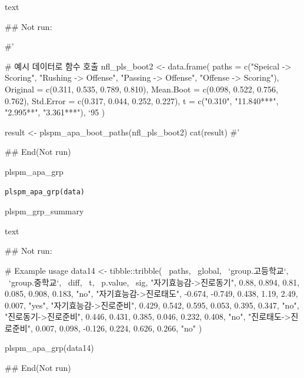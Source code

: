 \documentclass[a4paper]{book}
\begin{document}
%
\begin{Value}
text
\end{Value}
%
\begin{Examples}
\begin{ExampleCode}

\#\# Not run: 

#'

# 예시 데이터로 함수 호출
nfl_pls_boot2 <- data.frame(
  paths = c("Speical -> Scoring", "Rushing -> Offense", "Passing -> Offense", "Offense -> Scoring"),
  Original = c(0.311, 0.535, 0.789, 0.810),
  Mean.Boot = c(0.098, 0.522, 0.756, 0.762),
  Std.Error = c(0.317, 0.044, 0.252, 0.227),
  t = c("0.310", "11.840***", "2.995**", "3.361***"),
  `95%
)

result <- plspm_apa_boot_paths(nfl_pls_boot2)
cat(result)
#'

## End(Not run)

\end{ExampleCode}
\end{Examples}
%
\begin{Description}
plspm\_apa\_grp
\end{Description}
%
\begin{Usage}
\begin{verbatim}
plspm_apa_grp(data)
\end{verbatim}
\end{Usage}
%
\begin{Arguments}
\begin{ldescription}
\item[\code{data}] plspm\_grp\_summary
\end{ldescription}
\end{Arguments}
%
\begin{Value}
text
\end{Value}
%
\begin{Examples}
\begin{ExampleCode}

\#\# Not run: 

# Example usage
data14 <- tibble::tribble(
  ~paths, ~global, ~`group.고등학교`, ~`group.중학교`, ~diff, ~t, ~p.value, ~sig,
  "자기효능감->진로동기", 0.88, 0.894, 0.81, 0.085, 0.908, 0.183, "no",
  "자기효능감->진로태도", -0.674, -0.749, 0.438, 1.19, 2.49, 0.007, "yes",
  "자기효능감->진로준비", 0.429, 0.542, 0.595, 0.053, 0.395, 0.347, "no",
  "진로동기->진로준비", 0.446, 0.431, 0.385, 0.046, 0.232, 0.408, "no",
  "진로태도->진로준비", 0.007, 0.098, -0.126, 0.224, 0.626, 0.266, "no"
)

plspm_apa_grp(data14)


## End(Not run)

\end{ExampleCode}
\end{Examples}
\end{document}
